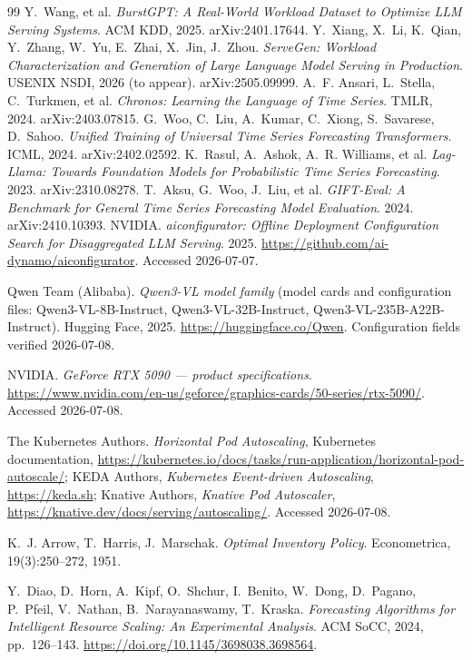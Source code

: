\begin{thebibliography}{99}
Y.~Wang, et al.
\emph{BurstGPT: A Real-World Workload Dataset to Optimize LLM Serving
Systems}.
ACM KDD, 2025. arXiv:2401.17644.
Y.~Xiang, X.~Li, K.~Qian, Y.~Zhang, W.~Yu, E.~Zhai, X.~Jin, J.~Zhou.
\emph{ServeGen: Workload Characterization and Generation of Large
Language Model Serving in Production}.
USENIX NSDI, 2026 (to appear). arXiv:2505.09999.
A.~F. Ansari, L.~Stella, C.~Turkmen, et al.
\emph{Chronos: Learning the Language of Time Series}.
TMLR, 2024. arXiv:2403.07815.
G.~Woo, C.~Liu, A.~Kumar, C.~Xiong, S.~Savarese, D.~Sahoo.
\emph{Unified Training of Universal Time Series Forecasting Transformers}.
ICML, 2024. arXiv:2402.02592.
K.~Rasul, A.~Ashok, A.~R. Williams, et al.
\emph{Lag-Llama: Towards Foundation Models for Probabilistic Time Series
Forecasting}.
2023. arXiv:2310.08278.
T.~Aksu, G.~Woo, J.~Liu, et al.
\emph{GIFT-Eval: A Benchmark for General Time Series Forecasting Model
Evaluation}.
2024. arXiv:2410.10393.
NVIDIA.
\emph{aiconfigurator: Offline Deployment Configuration Search for
Disaggregated LLM Serving}. 2025.
\url{https://github.com/ai-dynamo/aiconfigurator}. Accessed 2026-07-07.

Qwen Team (Alibaba).
\emph{Qwen3-VL model family} (model cards and configuration files:
Qwen3-VL-8B-Instruct, Qwen3-VL-32B-Instruct, Qwen3-VL-235B-A22B-Instruct).
Hugging Face, 2025. \url{https://huggingface.co/Qwen}. Configuration
fields verified 2026-07-08.

NVIDIA.
\emph{GeForce RTX 5090 --- product specifications}.
\url{https://www.nvidia.com/en-us/geforce/graphics-cards/50-series/rtx-5090/}.
Accessed 2026-07-08.

The Kubernetes Authors.
\emph{Horizontal Pod Autoscaling}, Kubernetes documentation,
\url{https://kubernetes.io/docs/tasks/run-application/horizontal-pod-autoscale/};
KEDA Authors, \emph{Kubernetes Event-driven Autoscaling},
\url{https://keda.sh}; Knative Authors, \emph{Knative Pod Autoscaler},
\url{https://knative.dev/docs/serving/autoscaling/}. Accessed 2026-07-08.

K.~J. Arrow, T.~Harris, J.~Marschak.
\emph{Optimal Inventory Policy}.
Econometrica, 19(3):250--272, 1951.

Y.~Diao, D.~Horn, A.~Kipf, O.~Shchur, I.~Benito, W.~Dong, D.~Pagano, P.~Pfeil,
V.~Nathan, B.~Narayanaswamy, T.~Kraska.
\emph{Forecasting Algorithms for Intelligent Resource Scaling: An Experimental
Analysis}.
ACM SoCC, 2024, pp.~126--143. \url{https://doi.org/10.1145/3698038.3698564}.


\end{thebibliography}

